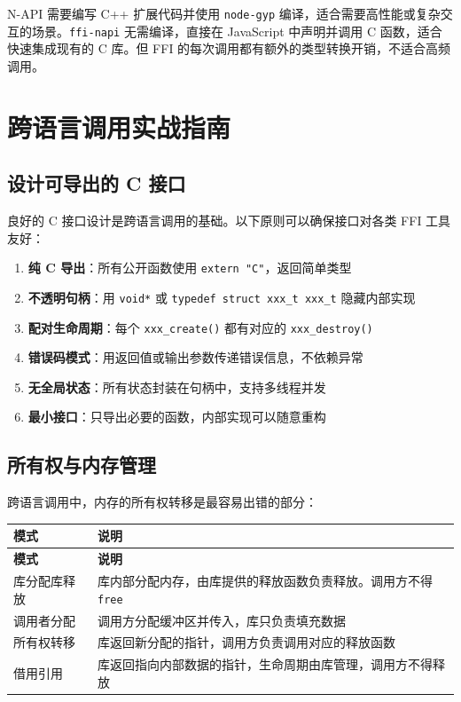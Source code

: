 \documentclass[12pt,a4paper,fontset=fandol]{ctexbook}
\newcommand{\cpp}[1]{C++#1}
\newcommand{\Fn}[1]{\texttt{#1()}}
\begin{document}
\begin{tcolorbox}[compare={N-API 与 FFI 对比}]
N-API 需要编写 \cpp{} 扩展代码并使用 \texttt{node-gyp} 编译，适合需要高性能或复杂交互的场景。\texttt{ffi-napi} 无需编译，直接在 JavaScript 中声明并调用 C 函数，适合快速集成现有的 C 库。但 FFI 的每次调用都有额外的类型转换开销，不适合高频调用。
\end{tcolorbox}


\chapter{跨语言调用实战指南}

\section{设计可导出的 C 接口}

良好的 C 接口设计是跨语言调用的基础。以下原则可以确保接口对各类 FFI 工具友好：

\begin{tcolorbox}[bestpractice={接口设计原则}]
\begin{enumerate}[nosep]
\item \textbf{纯 C 导出}：所有公开函数使用 \texttt{extern "C"}，返回简单类型
\item \textbf{不透明句柄}：用 \texttt{void*} 或 \texttt{typedef struct xxx\_t xxx\_t} 隐藏内部实现
\item \textbf{配对生命周期}：每个 \Fn{xxx\_create} 都有对应的 \Fn{xxx\_destroy}
\item \textbf{错误码模式}：用返回值或输出参数传递错误信息，不依赖异常
\item \textbf{无全局状态}：所有状态封装在句柄中，支持多线程并发
\item \textbf{最小接口}：只导出必要的函数，内部实现可以随意重构
\end{enumerate}
\end{tcolorbox}

\section{所有权与内存管理}

跨语言调用中，内存的所有权转移是最容易出错的部分：

\begin{longtable}{lp{9cm}}
\toprule
\textbf{模式} & \textbf{说明} \\
\midrule
\endfirsthead
\toprule
\textbf{模式} & \textbf{说明} \\
\midrule
\endhead
库分配库释放 & 库内部分配内存，由库提供的释放函数负责释放。调用方不得 \texttt{free} \\
调用者分配   & 调用方分配缓冲区并传入，库只负责填充数据 \\
所有权转移   & 库返回新分配的指针，调用方负责调用对应的释放函数 \\
借用引用     & 库返回指向内部数据的指针，生命周期由库管理，调用方不得释放 \\
\bottomrule
\end{longtable}
\end{document}
